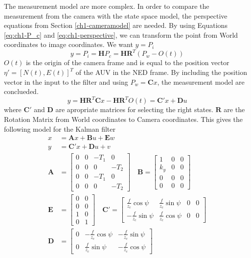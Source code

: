 	The measurement model are more complex. In order to compare the measurement from the camera with the
	state space model, the perspective equations from Section \ref{ch1-cameramodel} are needed. By using
	Equations \eqref{eq:ch1-P_c} and \eqref{eq:ch1-perspective}, we can transform the point from World
	coordinates to image coordinates. We want $y = P_i$
	\begin{equation*}
		y = P_i = \mathbf{H} P_c = \mathbf{H R}^T ( P_w - O(t))
	\end{equation*}
	$O(t)$ is the origin of the camera frame and is equal to the position vector $\eta' = [N(t),
	E(t)]^T$ of the AUV in the NED frame. By including the position vector in the input to the filter and using 
	$P_w = \mathbf{C} x$, the measurement model are conclueded.
	\begin{equation}
		\label{eq:ch2-measurement}
		y = \mathbf{H R}^T \mathbf{C} x - \mathbf{H R}^T  O(t) = \mathbf{C}'x + \mathbf{D} u
	\end{equation}
	where $\mathbf{C'}$ and $\mathbf{D}$ are apropriate matrices for selecting the right states. $\mathbf{R}$
	are the Rotation Matrix from World coordinates to Camera coordinates. This gives the following model
	for the Kalman filter
	\begin{align}
		x &= \mathbf{A} x + \mathbf{B} u + \mathbf{E} w\\
		y &= \mathbf{C}'x + \mathbf{D} u + v\\
		\mathbf{A} &= \left [ \begin{matrix}
					0 & 0 & -T_1 & 0 \\
					0 & 0 & 0 & -T_2 \\
					0 & 0 & -T_1 & 0 \\
					0 & 0 & 0 & -T_2 
					\end{matrix} \right] \quad \mathbf{B} = \left[ \begin{matrix}
										1 & 0 & 0 \\
										k_y & 0 & 0\\
										0   & 0 & 0 \\
										0 & 0 & 0
										\end{matrix} \right]\\
		\mathbf{E} &= \left [ \begin{matrix}
					0 & 0 \\
					0 & 0 \\
					1 & 0 \\
					0 & 1
					\end{matrix} \right] \quad \mathbf{C}' = \left [ \begin{matrix}
						\frac{f}{z_c} \cos{\psi} &\frac{f}{z_c} \sin{\psi} & 0 & 0 \\
						-\frac{f}{z_c} \sin{\psi}& \frac{f}{z_c} \cos{\psi} & 0 & 0 
								\end{matrix} \right] \\
		\mathbf{D} &= \left [ \begin{matrix}
					0 & -\frac{f}{z_c} \cos{\psi} & -\frac{f}{z_c} \sin{\psi} \\
					0 & \frac{f}{z_c} \sin{\psi} & -\frac{f}{z_c} \cos{\psi}
					\end{matrix} \right]
	\end{align}
